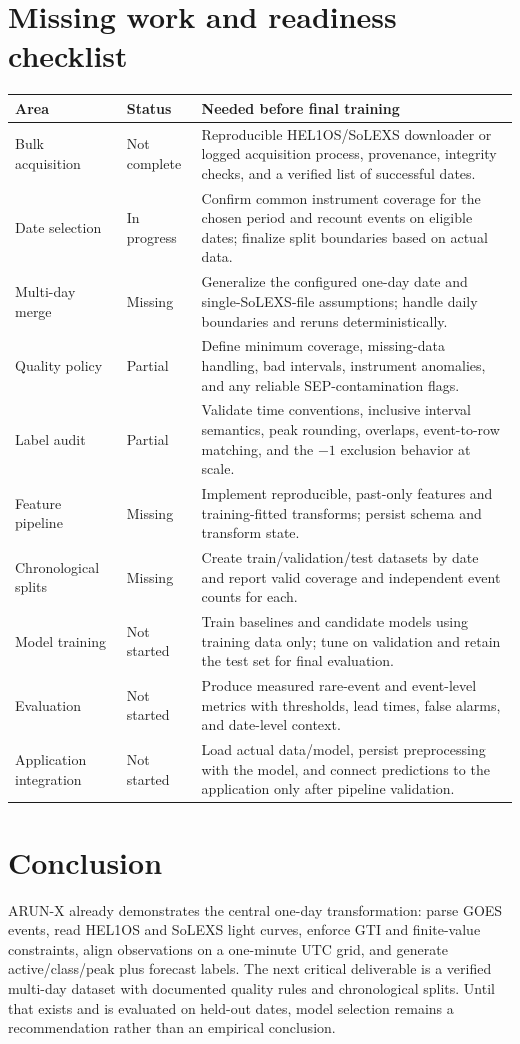 \documentclass[11pt,a4paper]{article}
\begin{document}
\section{Missing work and readiness checklist}

\begin{longtable}{p{}p{}p{}}
\toprule
\textbf{Area} & \textbf{Status} & \textbf{Needed before final training} \\
\midrule
Bulk acquisition & Not complete & Reproducible HEL1OS/SoLEXS downloader or logged acquisition process, provenance, integrity checks, and a verified list of successful dates. \\
Date selection & In progress & Confirm common instrument coverage for the chosen period and recount events on eligible dates; finalize split boundaries based on actual data. \\
Multi-day merge & Missing & Generalize the configured one-day date and single-SoLEXS-file assumptions; handle daily boundaries and reruns deterministically. \\
Quality policy & Partial & Define minimum coverage, missing-data handling, bad intervals, instrument anomalies, and any reliable SEP-contamination flags. \\
Label audit & Partial & Validate time conventions, inclusive interval semantics, peak rounding, overlaps, event-to-row matching, and the $-1$ exclusion behavior at scale. \\
Feature pipeline & Missing & Implement reproducible, past-only features and training-fitted transforms; persist schema and transform state. \\
Chronological splits & Missing & Create train/validation/test datasets by date and report valid coverage and independent event counts for each. \\
Model training & Not started & Train baselines and candidate models using training data only; tune on validation and retain the test set for final evaluation. \\
Evaluation & Not started & Produce measured rare-event and event-level metrics with thresholds, lead times, false alarms, and date-level context. \\
Application integration & Not started & Load actual data/model, persist preprocessing with the model, and connect predictions to the application only after pipeline validation. \\
\bottomrule
\end{longtable}

\section{Conclusion}

ARUN-X already demonstrates the central one-day transformation: parse GOES events, read HEL1OS and SoLEXS light curves, enforce GTI and finite-value constraints, align observations on a one-minute UTC grid, and generate active/class/peak plus forecast labels. The next critical deliverable is a verified multi-day dataset with documented quality rules and chronological splits. Until that exists and is evaluated on held-out dates, model selection remains a recommendation rather than an empirical conclusion.
\end{document}

